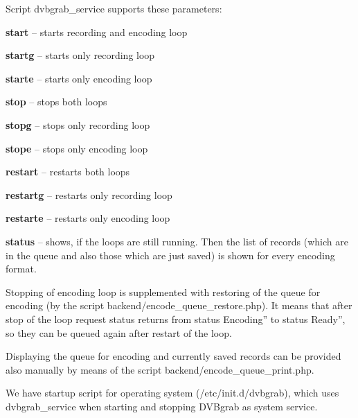 Script dvbgrab\_service supports these parameters:
\bitem
\item \textbf{start} -- starts recording and encoding loop
\item \textbf{startg} -- starts only recording loop
\item\textbf{starte} -- starts only encoding loop
\item\textbf{stop} -- stops both loops
\item\textbf{stopg} -- stops only recording loop
\item\textbf{stope} -- stops only encoding loop
\item\textbf{restart} -- restarts both loops
\item\textbf{restartg} -- restarts only recording loop
\item\textbf{restarte} -- restarts only encoding loop
\item\textbf{status} -- shows, if the loops are still running. Then the list of records (which are in the queue and also those which are just saved) is shown for every encoding format.
\eitem

Stopping of encoding loop is supplemented with restoring of the queue for encoding (by the script backend/encode\_queue\_restore.php). It means that after stop of the loop request status returns from status \quotedblbase Encoding'' to status \quotedblbase Ready'', so they can be queued again after restart of the loop.

Displaying the queue for encoding and currently saved records can be provided also manually by means of the script backend/encode\_queue\_print.php.

We have startup script for operating system (/etc/init.d/dvbgrab), which uses dvbgrab\_service when starting and stopping DVBgrab as system service.
